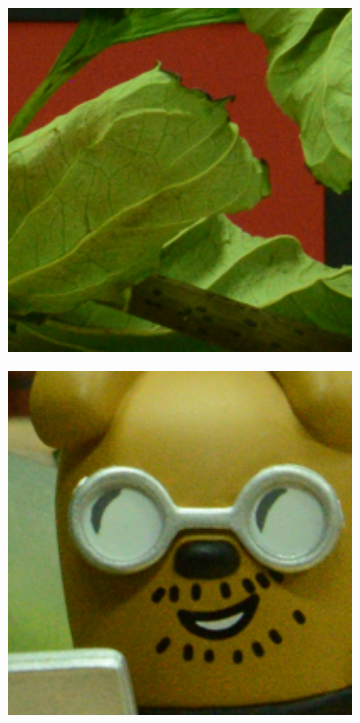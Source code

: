 \begin{figure}
\begin{subfigure}[t]{0.19\textwidth}
    \end{subfigure}
    \hfill
    \begin{subfigure}[t]{0.19\textwidth}
        \centering
        \includegraphics[width=1\textwidth]{images/mcwnnm/resize_d800_iso1600_3_real.png}
    \end{subfigure}
    \hfill
    \begin{subfigure}[t]{0.19\textwidth}
        \centering
        \includegraphics[width=1\textwidth]{images/mcwnnm/resize_d800_iso3200_1_real.png}

\end{subfigure}
\end{figure}
